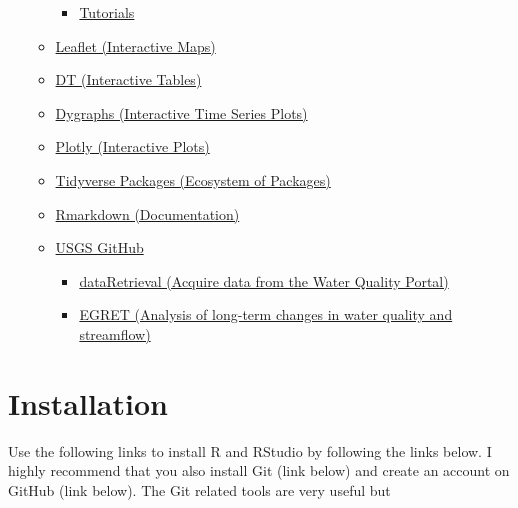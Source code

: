 \documentclass[
  letterpaper,
  DIV=11,
  numbers=noendperiod]{scrreprt}
\providecommand{\tightlist}{%
  \setlength{\itemsep}{0pt}\setlength{\parskip}{0pt}}\usepackage{longtable,booktabs,array}
\begin{document}
\begin{enumerate}
\begin{itemize}
    \begin{itemize}
    \tightlist
    \item
      \href{https://shiny.rstudio.com/tutorial/}{Tutorials}
    \end{itemize}
  \item
    \href{https://rstudio.github.io/leaflet/}{Leaflet (Interactive
    Maps)}
  \item
    \href{https://rstudio.github.io/DT/}{DT (Interactive Tables)}
  \item
    \href{https://rstudio.github.io/dygraphs/}{Dygraphs (Interactive
    Time Series Plots)}
  \item
    \href{https://plot.ly/r/}{Plotly (Interactive Plots)}
  \item
    \href{https://www.tidyverse.org/}{Tidyverse Packages (Ecosystem of
    Packages)}
  \item
    \href{https://rmarkdown.rstudio.com/lesson-1.html}{Rmarkdown
    (Documentation)}
  \item
    \href{https://github.com/USGS-R}{USGS GitHub}

    \begin{itemize}
    \item
      \href{https://cran.r-project.org/web/packages/dataRetrieval/vignettes/dataRetrieval.html}{dataRetrieval
      (Acquire data from the Water Quality Portal)}
    \item
      \href{https://cran.r-project.org/web/packages/EGRET/vignettes/EGRET.pdf}{EGRET
      (Analysis of long-term changes in water quality and streamflow)}
    \end{itemize}
  \end{itemize}
\end{enumerate}


\hypertarget{installation}{%
\chapter{Installation}\label{installation}}

Use the following links to install R and RStudio by following the links
below. I highly recommend that you also install Git (link below) and
create an account on GitHub (link below). The Git related tools are very
useful but
\end{document}
